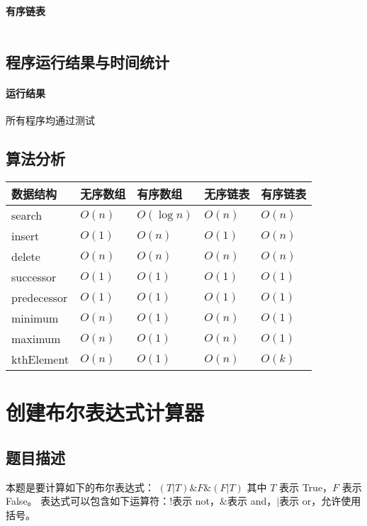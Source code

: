 \documentclass[UTF8]{ctexart}
\begin{document}
      \paragraph{有序链表}
      \inputminted{java}{src/sylxjtu/SortedLinkedList.java}
    \subsection{程序运行结果与时间统计}
      \paragraph{运行结果}
      所有程序均通过测试

    \subsection{算法分析}
      \begin{table}[h!]
      \centering
      \begin{tabular}{|l|l|l|l|l|}
      \hline
      数据结构        & \textbf{无序数组} & \textbf{有序数组} & \textbf{无序链表} & \textbf{有序链表} \\
      \hline
      search      & $O(n)$        & $O(\log n)$   & $O(n)$        & $O(n)$        \\
      insert      & $O(1)$        & $O(n)$        & $O(1)$        & $O(n)$        \\
      delete      & $O(n)$        & $O(n)$        & $O(n)$        & $O(n)$        \\
      successor   & $O(1)$        & $O(1)$        & $O(1)$        & $O(1)$        \\
      predecessor & $O(1)$        & $O(1)$        & $O(1)$        & $O(1)$        \\
      minimum     & $O(n)$        & $O(1)$        & $O(n)$        & $O(1)$        \\
      maximum     & $O(n)$        & $O(1)$        & $O(n)$        & $O(1)$        \\
      kthElement  & $O(n)$        & $O(1)$        & $O(n)$        & $O(k)$        \\
      \hline
      \end{tabular}
      \end{table}
  \section{创建布尔表达式计算器}
    \subsection{题目描述}
      本题是要计算如下的布尔表达式： $(T |T)\& F \&(F|T)$
      其中 $T$ 表示 True，$F$ 表示 False。
      表达式可以包含如下运算符：$!$表示 not，$\&$表示 and，$|$表示 or，允许使用括号。
\end{document}
